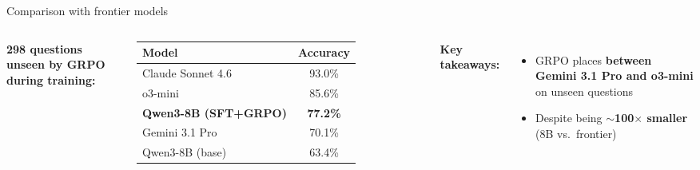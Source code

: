 \documentclass[aspectratio=169,10pt]{beamer}
\begin{document}
\begin{frame}{Comparison with frontier models}
\begin{columns}[T]

\textbf{298 questions unseen by GRPO during training:}
\vspace{0.3em}

\centering
\begin{tabular}{@{}lc@{}}
  \toprule
  \textbf{Model} & \textbf{Accuracy} \\
  \midrule
  Claude Sonnet 4.6      & 93.0\% \\
  o3-mini                & 85.6\% \\
  \textbf{Qwen3-8B (SFT+GRPO)}   & \textbf{77.2\%} \\
  Gemini 3.1 Pro         & 70.1\% \\
  Qwen3-8B (base)        & 63.4\% \\
  \bottomrule
\end{tabular}

\vspace{0.5em}

\textbf{Key takeaways:}
\begin{itemize}\small
  \item GRPO places \textbf{between Gemini 3.1 Pro and o3-mini} on unseen questions
  \item Despite being \textbf{$\sim$100$\times$ smaller} (8B vs.\ frontier)
\end{itemize}

\vspace{0.5em}

\end{columns}
\end{frame}

\end{document}
